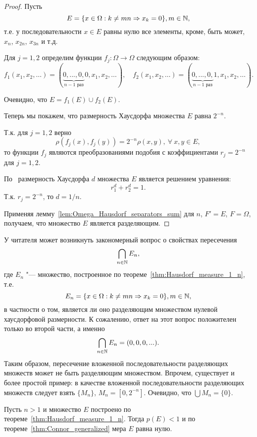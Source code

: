 \begin{proof}
	Пусть
	\begin{equation}
		E= \{ x \in \Omega : k \neq mn \Rightarrow x_k = 0\}, m\in \mathbb{N}
		,
	\end{equation}
	т.е. у последовательности $x \in E$ равны нулю все элементы, кроме, быть может, $x_n$, $x_{2n}$, $x_{3n}$ и т.д.

	Для $j=1,2$ определим функции $f_j : \Omega \to \Omega$ следующим образом:
	\begin{equation}
		f_1(x_1, x_2, \dots)=(\underbrace{0, ..., 0,}_{\mbox{$n-1$ раз}} 0, x_1, x_2, \dots)
		,
		\quad
		f_2(x_1, x_2, \dots)=(\underbrace{0, ..., 0,}_{\mbox{$n-1$ раз}} 1, x_1, x_2, \dots)
		.
	\end{equation}

	Очевидно, что $E=f_1(E)\cup f_2(E).$

	Теперь мы покажем, что размерность Хаусдорфа множества $E$ равна $2^{-n}$.

	Т.к. для $j=1,2$ верно
	 $$\rho(f_j(x),f_j(y))=2^{-n}\rho(x,y), \ \forall \ x, y \in E,$$
	 то функции $f_j$ являются преобразованиями подобия с коэффициентами $r_j=2^{-n}$ для $j=1,2$.


	По~\cite[Теорема 9.3]{Edgar} размерность Хаусдорфа $d$ множества $E$ является решением уравнения:
	$$ r_1^d+r_2^d=1.$$
	Т.к. $r_j=2^{-n}$, то
	$d=1/n.$

	Применяя лемму~\ref{lem:Omega_Hausdorf_separators_sum}
	для $n$, $F'=E$, $F=\Omega$, получаем, что множество $E$ является разделяющим.
\end{proof}

\begin{remark}
	У читателя может возникнуть закономерный вопрос о свойствах пересечения
	\begin{equation}
		\bigcap_{n\in \mathbb{N}} E_{n}
		,
	\end{equation}
	где $E_n$ "--- множество, построенное по теореме~\ref{thm:Hausdorf_measure_1_n}, т.е.
	\begin{equation}
		E_n = \{ x \in \Omega : k \neq mn \Rightarrow x_k = 0\}, m\in \mathbb{N}
		,
	\end{equation}
	в частности о том, является ли оно разделяющим множеством нулевой хаусдорфовой размерности.
	К сожалению, ответ на этот вопрос положителен только во второй части, а именно
	\begin{equation}
		\bigcap_{n\in \mathbb{N}} E_n = {(0,0,0,...)}
		.
	\end{equation}
	Таким образом, пересечение вложенной последовательности разделяющих множеств может не быть разделяющим множеством.
	Впрочем, существует и более простой пример:
	в качестве вложенной последовательности разделяющих множеств следует взять $\{M_n\}$, $M_n = [0, 2^{-n}]$.
	Очевидно, что $\bigcup\limits M_n = \{0\}$.
\end{remark}


\begin{remark}
	Пусть $n>1$ и множество $E$ построено по теореме~\ref{thm:Hausdorf_measure_1_n}.
	Тогда $p(E)< 1$ и по теореме~\ref{thm:Connor_generalized} мера $E$ равна нулю.
\end{remark}
